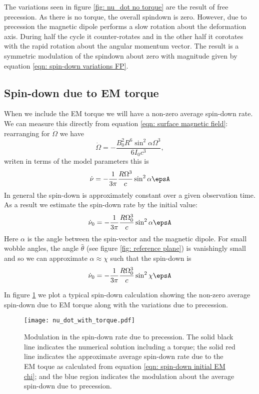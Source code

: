 \documentclass[/home/greg/Thesis/main/main.tex]{subfiles}
\begin{document}
The variations seen in figure \ref{fig: nu_dot no torque} are the result of
free precession. As there is no torque, the overall spindown is zero. However,
due to precession the magnetic dipole performs a slow rotation about the
deformation axis. During half the cycle it counter-rotates and in the other
half it corotates with the rapid rotation about the angular momentum vector.
The result is a symmetric modulation of the spindown about zero with magnitude
given by equation \eqref{eqn: spin-down variations FP}.

\subsection{Spin-down due to EM torque}
When we include the EM torque we will have a non-zero average spin-down rate. 
We can measure this directly from equation \eqref{eqn: surface magnetic field}:
rearranging for $\dot{\Omega}$ we have
\begin{equation}
    \dot{\Omega} = -\frac{B_{0}^{2}R^{6} \sin^{2}\alpha \Omega^{3}}{6I_{0}c^{3}},
\end{equation}
writen in terms of the model parameters this is
\begin{equation}
\dot{\nu} = -\frac{1}{3\pi}\frac{R \Omega^{3}}{c} \sin^{2}\alpha \epsA
\end{equation}
In general the spin-down is approximately constant over a given observation
time. As a result we estimate the spin-down rate by the initial value:
\begin{equation}
    \dot{\nu}_{0} = -\frac{1}{3\pi}\frac{R \Omega_{0}^{3}}{c} \sin^{2}\alpha \epsA
    \label{eqn: spin-down initial EM}
\end{equation}
Here $\alpha$ is the angle between the spin-vector and the magnetic dipole. For
small wobble angles, the angle $\hat{\theta}$ (see figure \ref{fig: reference plane})
is vanishingly small and so we can approximate $\alpha \approx \chi$ such that
the spin-down is 
\begin{equation}
    \dot{\nu}_{0} = -\frac{1}{3\pi}\frac{R \Omega_{0}^{3}}{c} \sin^{2}\chi \epsA
    \label{eqn: spin-down initial EM chi}
\end{equation}


In figure \ref{fig: nu_dot with torque} we plot a typical spin-down calculation
showing the non-zero average spin-down due to EM torque along with the 
variations due to precession.
\begin{figure}[ht]
\centering
	\texttt{[image: nu\_dot\_with\_torque.pdf]}
\caption{Modulation in the spin-down rate due to precession. The solid black line
indicates the numerical solution including a torque; the solid red line indicates
the approximate average spin-down rate due to the EM toque as calculated
from equation \eqref{eqn: spin-down initial EM chi}; and the blue region indicates
the modulation about the average spin-down due to precession.}
\label{fig: nu_dot with torque}
\end{figure}
\end{document}

